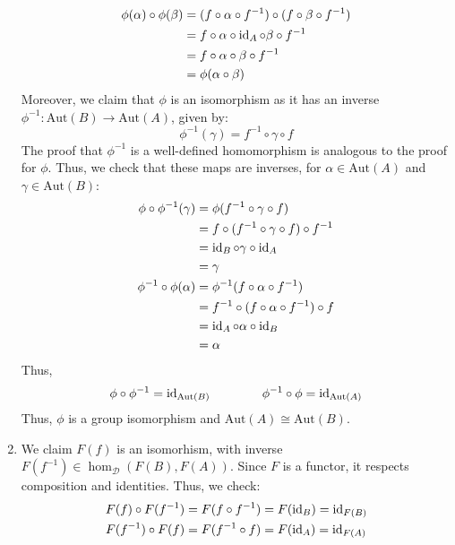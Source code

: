 \documentclass[12pt]{article}
\begin{document}
\begin{solution}
\begin{enumerate}
\begin{align*}
            \phi(\alpha) \circ \phi(\beta) &= (f \circ \alpha \circ f^{-1}) \circ (f \circ \beta \circ f^{-1}) \\
            &= f \circ \alpha \circ \operatorname{id}_A \circ \beta \circ f^{-1} \\
            &= f \circ \alpha \circ \beta \circ f^{-1} \\
            &= \phi(\alpha \circ \beta)
        \end{align*}
        Moreover, we claim that $\phi$ is an isomorphism as it has an inverse $\phi^{-1}: \text{Aut}(B) \to \text{Aut}(A)$, given by: 
        \[ \phi^{-1}(\gamma) = f^{-1} \circ \gamma \circ f \]
        The proof that $\phi^{-1}$ is a well-defined homomorphism is analogous to the proof for $\phi$. Thus, we check that these maps are inverses, for $\alpha \in \text{Aut}(A)$ and $\gamma \in \text{Aut}(B)$:
        \begin{align*}
            \phi \circ \phi^{-1}(\gamma) &= \phi( f^{-1} \circ \gamma \circ f) \\
            &= f \circ (f^{-1} \circ \gamma \circ f) \circ f^{-1} \\
            &= \operatorname{id}_B \circ \gamma \circ \operatorname{id}_A \\
            &= \gamma \\
            \phi^{-1} \circ \phi(\alpha) &= \phi^{-1}(f \circ \alpha \circ f^{-1}) \\
            &= f^{-1} \circ (f \circ \alpha \circ f^{-1}) \circ f \\
            &= \operatorname{id}_A \circ \alpha \circ \operatorname{id}_B \\
            &= \alpha 
        \end{align*}
        Thus, 
        \[ \phi \circ \phi^{-1} = \operatorname{id}_{\text{Aut}(B)} \qquad \qquad \phi^{-1} \circ \phi = \operatorname{id}_{\text{Aut}(A)} \]
        Thus, $\phi$ is a group isomorphism and $\text{Aut}(A) \cong \text{Aut}(B)$.
        \item We claim $F(f)$ is an isomorhism, with inverse $F(f^{-1}) \in \hom_\mathcal{D} (F(B), F(A))$. Since $F$ is a functor, it respects composition and identities. Thus, we check:
        \begin{align*}
            F(f) \circ F(f^{-1}) &= F(f \circ f^{-1}) = F(\operatorname{id}_B) = \operatorname{id}_{F(B)} \\
            F(f^{-1}) \circ F(f) &= F(f^{-1} \circ f) = F(\operatorname{id}_A) = \operatorname{id}_{F(A)}
        \end{align*}
    \end{enumerate}
\end{solution}
\newpage
\end{document}
